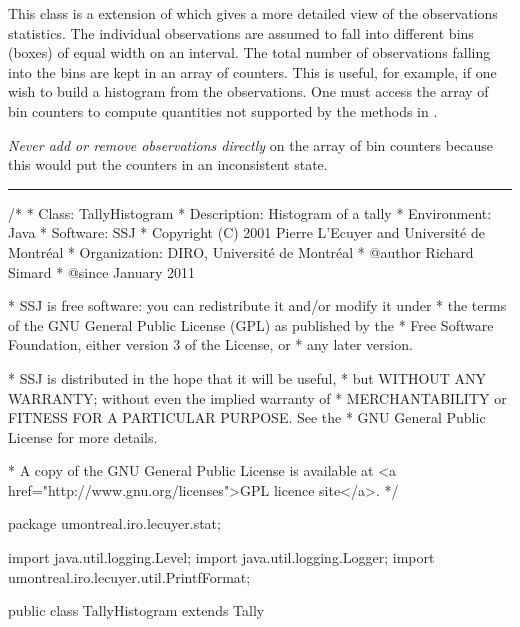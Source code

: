 
This class is a extension of  which gives a more detailed view
of the observations statistics. The individual observations are assumed to
fall into different bins (boxes) of equal width on an interval. 
The total number of observations falling into the bins are kept in an array
of counters. This is useful, for example, if one wish to build a histogram
from the observations. One must access the array of bin counters
to compute quantities not supported by the methods in .

\emph{Never add or remove observations directly} on the array of 
bin counters because this would put the  counters in an
inconsistent state.


\bigskip\hrule

\begin{code}
\begin{hide}
/*
 * Class:        TallyHistogram
 * Description:  Histogram of a tally
 * Environment:  Java
 * Software:     SSJ 
 * Copyright (C) 2001  Pierre L'Ecuyer and Université de Montréal
 * Organization: DIRO, Université de Montréal
 * @author       Richard Simard
 * @since        January 2011

 * SSJ is free software: you can redistribute it and/or modify it under
 * the terms of the GNU General Public License (GPL) as published by the
 * Free Software Foundation, either version 3 of the License, or
 * any later version.

 * SSJ is distributed in the hope that it will be useful,
 * but WITHOUT ANY WARRANTY; without even the implied warranty of
 * MERCHANTABILITY or FITNESS FOR A PARTICULAR PURPOSE.  See the
 * GNU General Public License for more details.

 * A copy of the GNU General Public License is available at
   <a href="http://www.gnu.org/licenses">GPL licence site</a>.
 */
\end{hide}
package umontreal.iro.lecuyer.stat;\begin{hide}
import java.util.logging.Level;
import java.util.logging.Logger;
import umontreal.iro.lecuyer.util.PrintfFormat;
\end{hide}


public class TallyHistogram extends Tally \begin{hide} {
   private int[] co;         // counter: num of values in bin[i]
   private int numBins;      // number of bins
   private double m_h;       // width of 1 bin
   private double m_a;       // left boundary of first bin
   private double m_b;       // right boundary of last bin
   private Logger log = Logger.getLogger ("umontreal.iro.lecuyer.stat");
\end{hide}
\end{code}

